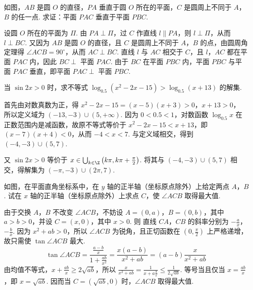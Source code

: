 \documentclass[UTF8,a4paper,oneside,11pt]{ctexbook}
\begin{document}
\begin{problem}

如图，\(AB\) 是圆 \(O\) 的直径，\(PA\) 垂直于圆 \(O\) 所在的平面，\(C\) 是圆周上不同于 \(A\)，\(B\) 的任一点. 求证：平面 \(PAC\) 垂直于平面 \(PBC\).

\end{problem}

\begin{solution}
设圆 \(O\) 所在的平面为 \(\Pi\). 由 \(PA\perp\Pi\)，过 \(C\) 作直线 \(l\parallel PA\)，则 \(l\perp\Pi\)，从而 \(l\perp BC\). 又因为 \(AB\) 是圆 \(O\) 的直径，且 \(C\) 是圆周上不同于 \(A\)，\(B\) 的点，由圆周角定理得 \(\angle ACB=90^\circ\)，从而 \(AC\perp BC\). 直线 \(l\) 与 \(AC\) 相交于 \(C\)，且 \(l\)，\(AC\) 都在平面 \(PAC\) 内，因此 \(BC\perp\) 平面 \(PAC\). 由于 \(BC\) 在平面 \(PBC\) 内，平面 \(PBC\) 与平面 \(PAC\) 垂直，即平面 \(PAC\perp\) 平面 \(PBC\).
\end{solution}

\begin{problem}

当 \(\sin 2x > 0\) 时，求不等式 \(\log_{0.5}(x^2 - 2x - 15) > \log_{0.5}(x + 13)\) 的解集.
\end{problem}

\begin{solution}
首先由对数真数为正，得
\(x^2-2x-15=(x-5)(x+3)>0\)，\(x+13>0\)，
所以定义域为 \((-13,-3)\cup(5,+\infty)\). 因为 \(0<0.5<1\)，对数函数 \(\log_{0.5}x\) 在正数范围内是减函数，故原不等式等价于
\(x^2-2x-15<x+13\)，即 \((x-7)(x+4)<0\)，从而 \(-4<x<7\). 与定义域相交，得到 \((-4,-3)\cup(5,7)\).

又 \(\sin 2x>0\) 等价于 \(x\in\bigcup_{k\in\Z}\left(k\pi,k\pi+\frac{\pi}{2}\right)\). 将其与 \((-4,-3)\cup(5,7)\) 相交，得解集为 \((-\pi,-3)\cup(2\pi,7)\).
\end{solution}

\begin{problem}

如图，在平面直角坐标系中，在 \(y\) 轴的正半轴（坐标原点除外）上给定两点 \(A\)，\(B\). 试在 \(x\) 轴的正半轴（坐标原点除外）上求点 \(C\)，使 \(\angle ACB\) 取得最大值.

\end{problem}

\begin{solution}
由于交换 \(A\)，\(B\) 不改变 \(\angle ACB\)，不妨设 \(A=(0,a)\)，\(B=(0,b)\)，其中 \(a>b>0\)，并设 \(C=(x,0)\)，其中 \(x>0\). 则
直线 \(CA\)，\(CB\) 的斜率分别为 \(-\frac{a}{x}\)，\(-\frac{b}{x}\). 因为 \(x^2+ab>0\)，所以 \(\angle ACB\) 为锐角，且正切函数在 \(\left(0,\frac{\pi}{2}\right)\) 上严格递增，故只需使 \(\tan\angle ACB\) 最大.
\[
\tan\angle ACB=\frac{\frac{a-b}{x}}{1+\frac{ab}{x^2}}=\frac{x(a-b)}{x^2+ab}=(a-b)\frac{x}{x^2+ab}
\]
由均值不等式，\(x+\frac{ab}{x}\geq2\sqrt{ab}\)，所以
\(\frac{x}{x^2+ab}=\frac{1}{x+a\frac{b}{x}}\leq\frac{1}{2\sqrt{ab}}\). 等号当且仅当 \(x=\frac{ab}{x}\)，即 \(x=\sqrt{ab}\). 因而当 \(C=(\sqrt{ab},0)\) 时，\(\angle ACB\) 取得最大值.
\end{solution}
\end{document}
